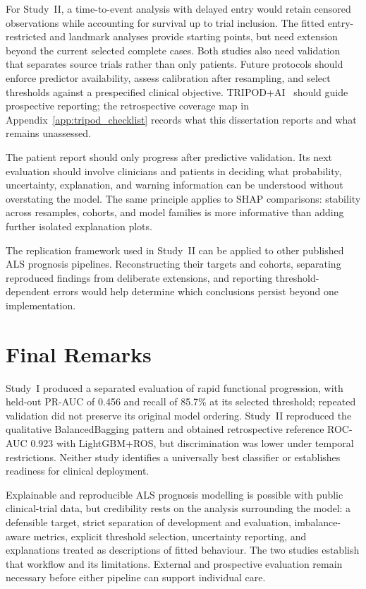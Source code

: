 For Study~II, a time-to-event analysis with delayed entry would retain censored observations while accounting for survival up to trial inclusion. The fitted entry-restricted and landmark analyses provide starting points, but need extension beyond the current selected complete cases. Both studies also need validation that separates source trials rather than only patients. Future protocols should enforce predictor availability, assess calibration after resampling, and select thresholds against a prespecified clinical objective. TRIPOD+AI~\cite{collins2024tripodai} should guide prospective reporting; the retrospective coverage map in Appendix~\ref{app:tripod_checklist} records what this dissertation reports and what remains unassessed.

The patient report should only progress after predictive validation. Its next evaluation should involve clinicians and patients in deciding what probability, uncertainty, explanation, and warning information can be understood without overstating the model. The same principle applies to SHAP comparisons: stability across resamples, cohorts, and model families is more informative than adding further isolated explanation plots.

The replication framework used in Study~II can be applied to other published \gls{ALS} prognosis pipelines. Reconstructing their targets and cohorts, separating reproduced findings from deliberate extensions, and reporting threshold-dependent errors would help determine which conclusions persist beyond one implementation.

\section{Final Remarks}
\label{sec:conclusion_final}

Study~I produced a separated evaluation of rapid functional progression, with held-out \gls{PR-AUC} of 0.456 and recall of 85.7\% at its selected threshold; repeated validation did not preserve its original model ordering. Study~II reproduced the qualitative BalancedBagging pattern and obtained retrospective reference ROC-AUC 0.923 with LightGBM+ROS, but discrimination was lower under temporal restrictions. Neither study identifies a universally best classifier or establishes readiness for clinical deployment.

Explainable and reproducible \gls{ALS} prognosis modelling is possible with public clinical-trial data, but credibility rests on the analysis surrounding the model: a defensible target, strict separation of development and evaluation, imbalance-aware metrics, explicit threshold selection, uncertainty reporting, and explanations treated as descriptions of fitted behaviour. The two studies establish that workflow and its limitations. External and prospective evaluation remain necessary before either pipeline can support individual care.
